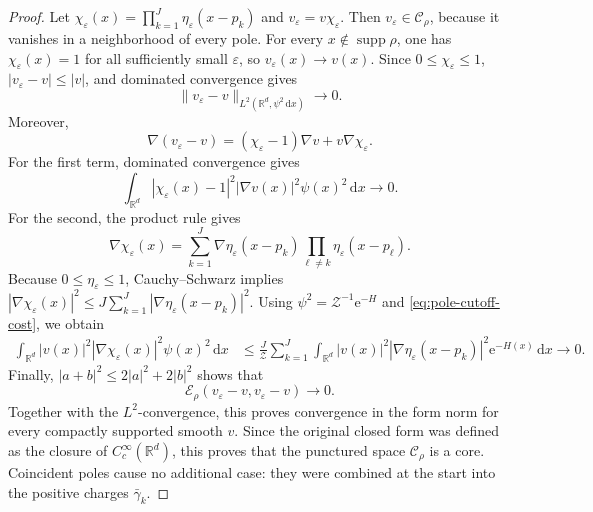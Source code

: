 \documentclass[12pt,reqno,letterpaper]{amsart}
\theoremstyle{definition}
\theoremstyle{remark}
\numberwithin{equation}{section}
\newcommand{\R}{\mathbb R}
\newcommand{\dd}{\,\mathrm d}
\newcommand{\ee}{\mathrm e}
\newcommand{\cE}{\mathcal E}
\begin{document}
\begin{proof}
Let
\(\chi_\varepsilon(x)=\prod_{k=1}^J
\eta_\varepsilon(x-p_k)\) and
\(v_\varepsilon=v\chi_\varepsilon\).  Then
\(v_\varepsilon\in\mathcal C_\rho\), because it vanishes in a neighborhood
of every pole.  For every \(x\notin\operatorname{supp}\rho\), one has
\(\chi_\varepsilon(x)=1\) for all sufficiently small \(\varepsilon\), so
\(v_\varepsilon(x)\to v(x)\).  Since \(0\le\chi_\varepsilon\le1\),
\(|v_\varepsilon-v|\le|v|\), and dominated convergence gives
\[
 \|v_\varepsilon-v\|_{L^2(\R^d,\psi^2\dd x)}\longrightarrow0.
\]
Moreover,
\[
 \nabla(v_\varepsilon-v)
 =(\chi_\varepsilon-1)\nabla v+v\nabla\chi_\varepsilon.
\]
For the first term, dominated convergence gives
\[
 \int_{\R^d}|\chi_\varepsilon(x)-1|^2|\nabla v(x)|^2
 \psi(x)^2\dd x\longrightarrow0.
\]
For the second, the product rule gives
\[
 \nabla\chi_\varepsilon(x)
 =\sum_{k=1}^J\nabla\eta_\varepsilon(x-p_k)
   \prod_{\ell\ne k}\eta_\varepsilon(x-p_\ell).
\]
Because \(0\le\eta_\varepsilon\le1\), Cauchy--Schwarz implies $|\nabla\chi_\varepsilon(x)|^2
 \le J\sum_{k=1}^J
 |\nabla\eta_\varepsilon(x-p_k)|^2.$
Using \(\psi^2=\mathcal Z^{-1}\ee^{-H}\) and
\eqref{eq:pole-cutoff-cost}, we obtain
\begin{align*}
 \int_{\R^d}|v(x)|^2|\nabla\chi_\varepsilon(x)|^2
 \psi(x)^2\dd x
 &\le\frac{J}{\mathcal Z}\sum_{k=1}^J
 \int_{\R^d}|v(x)|^2|\nabla\eta_\varepsilon(x-p_k)|^2
 \ee^{-H(x)}\dd x\longrightarrow0.
\end{align*}
Finally, \(|a+b|^2\le2|a|^2+2|b|^2\) shows that
\[
 \cE_\rho(v_\varepsilon-v,v_\varepsilon-v)\longrightarrow0.
\]
Together with the \(L^2\)-convergence, this proves convergence in the form
norm for every compactly supported smooth \(v\).  Since the original closed
form was defined as the closure of \(C_c^\infty(\R^d)\), this proves that the
punctured space \(\mathcal C_\rho\) is a core.  Coincident poles cause no
additional case: they were combined at the start into the positive charges
\(\bar\gamma_k\).



\end{proof}
\end{document}
